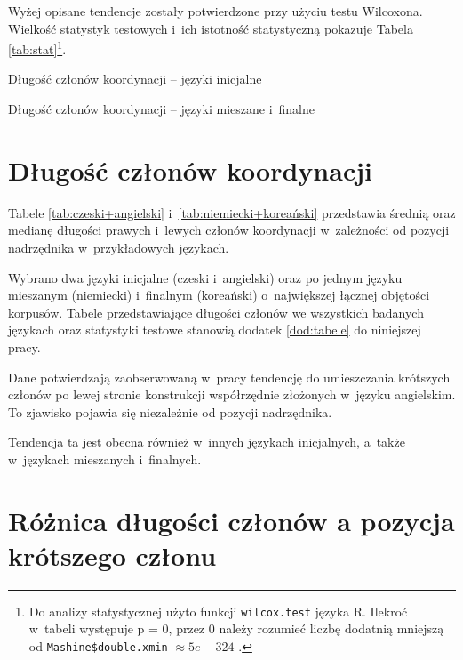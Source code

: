 Wyżej opisane tendencje zostały potwierdzone przy użyciu testu Wilcoxona. Wielkość statystyk testowych i~ich istotność statystyczną pokazuje Tabela \ref{tab:stat}\footnote{
Do analizy statystycznej użyto funkcji \texttt{wilcox.test} języka R. Ilekroć w~tabeli występuje p = 0, przez 0 należy rozumieć liczbę dodatnią mniejszą od \texttt{Mashine\$double.xmin} $\approx 5e-324$ \citep{R2023}.}.



\begin{table}[H]
\centering
\resizebox{\linewidth}{!}{

\quad

}
\caption{Długość członów koordynacji -- języki inicjalne}
\label{tab:czeski+angielski}
\end{table}

\begin{table}[H]
\centering
\resizebox{\linewidth}{!}{

\quad

}
\caption{Długość członów koordynacji -- języki mieszane i~finalne}
\label{tab:niemiecki+koreański}
\end{table}

\section{Długość członów koordynacji}

Tabele \ref{tab:czeski+angielski} i~\ref{tab:niemiecki+koreański} przedstawia średnią oraz medianę długości prawych i~lewych członów koordynacji w~zależności od pozycji nadrzędnika w~przykładowych językach. 

Wybrano dwa języki inicjalne (czeski i~angielski) oraz po jednym języku mieszanym (niemiecki) i~finalnym (koreański) o~największej łącznej objętości korpusów. Tabele przedstawiające długości członów we wszystkich badanych językach oraz statystyki testowe stanowią dodatek \ref{dod:tabele} do niniejszej pracy.

Dane potwierdzają zaobserwowaną w~pracy \cite{przepiorkowski2023conjunct} tendencję do umieszczania krótszych członów po lewej stronie konstrukcji współrzędnie złożonych w~języku angielskim. To zjawisko pojawia się niezależnie od pozycji nadrzędnika.

Tendencja ta jest obecna również w~innych językach inicjalnych, a~także w~językach mieszanych i~finalnych.

\section{Różnica długości członów a pozycja krótszego członu}


